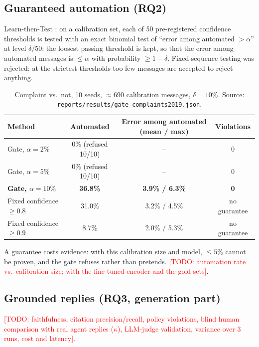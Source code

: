 \documentclass[11pt,a4paper]{article}
\newcommand{\todo}[1]{\textcolor{red}{[TODO: #1]}}
\newcommand{\res}[1]{\texttt{\small reports/results/#1}}
\begin{document}
\subsection{Guaranteed automation (RQ2)}
\label{sec:gate}
Learn-then-Test \citep{angelopoulos2021ltt}: on a calibration set, each of 50 pre-registered
confidence thresholds is tested with an exact binomial test of ``error among automated $> \alpha$''
at level $\delta/50$; the loosest passing threshold is kept, so that the error among automated
messages is $\leq \alpha$ with probability $\geq 1-\delta$. Fixed-sequence testing was rejected: at
the strictest thresholds too few messages are accepted to reject anything.

\begin{table}[h]
\centering\small
\begin{tabular}{lccc}
\toprule
Method & Automated & Error among automated (mean / max) & Violations \\
\midrule
Gate, $\alpha=2\%$ & 0\% (refused 10/10) & -- & 0 \\
Gate, $\alpha=5\%$ & 0\% (refused 10/10) & -- & 0 \\
\textbf{Gate, $\alpha=10\%$} & \textbf{36.8\%} & \textbf{3.9\% / 6.3\%} & \textbf{0} \\
Fixed confidence $\geq 0.8$ & 31.0\% & 3.2\% / 4.5\% & no guarantee \\
Fixed confidence $\geq 0.9$ & 8.7\% & 2.0\% / 5.3\% & no guarantee \\
\bottomrule
\end{tabular}
\caption{Complaint vs.\ not, 10 seeds, $\approx$690 calibration messages, $\delta=10\%$. Source:
\res{gate\_complaints2019.json}.}
\end{table}
A guarantee costs evidence: with this calibration size and model, $\leq 5\%$ cannot be proven, and
the gate refuses rather than pretends. \todo{automation rate vs.\ calibration size; with the
fine-tuned encoder and the gold sets}.

\subsection{Grounded replies (RQ3, generation part)}
\todo{faithfulness, citation precision/recall, policy violations, blind human comparison with real
agent replies ($\kappa$), LLM-judge validation, variance over 3 runs, cost and latency}.
\end{document}
